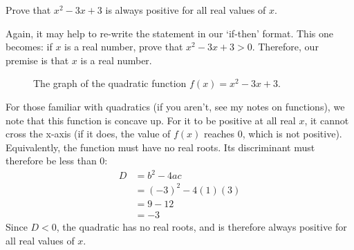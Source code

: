 \begin{exercise}[Easy]
  Prove that $x^2 - 3x + 3$ is always positive for all real values of $x$. 
\end{exercise}
\begin{answer}
  Again, it may help to re-write the statement in our `if-then' format. This one becomes: 
  if $x$ is a real number, prove that $x^2 - 3x + 3 > 0$. Therefore, our premise is that $x$ is a real number.
  
  \begin{figure}[H]
    \centering
    \caption{The graph of the quadratic function $f(x) = x^2 - 3x + 3$.}
  \end{figure}
  For those familiar with quadratics (if you aren't, see my notes on functions), we note that this function is concave up. 
  For it to be positive at all real $x$, it cannot cross the x-axis (if it does, the value of $f(x)$ reaches $0$, which is not positive). 
  Equivalently, the function must have no real roots. Its discriminant must therefore be less than 0:
  \begin{align*}
    D &= b^2 - 4ac \\
      &= (-3)^2 - 4(1)(3) \\
      &= 9 - 12 \\
      &= -3
  \end{align*}
  Since $D < 0$, the quadratic has no real roots, and is therefore always positive for all real values of $x$.
\end{answer}

